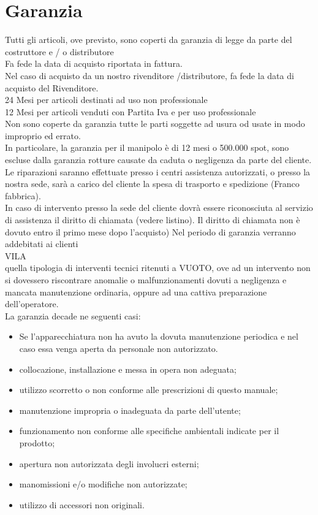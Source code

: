 \documentclass[10pt]{article}
\begin{document}
\section{Garanzia}
Tutti gli articoli, ove previsto, sono coperti da garanzia di legge da parte del costruttore e / o distributore\\
Fa fede la data di acquisto riportata in fattura.\\
Nel caso di acquisto da un nostro rivenditore /distributore, fa fede la data di acquisto del Rivenditore.\\
24 Mesi per articoli destinati ad uso non professionale\\
12 Mesi per articoli venduti con Partita Iva e per uso professionale\\
Non sono coperte da garanzia tutte le parti soggette ad usura od usate in modo improprio ed errato.\\
In particolare, la garanzia per il manipolo è di 12 mesi o 500.000 spot, sono escluse dalla garanzia rotture causate da caduta o negligenza da parte del cliente.\\
Le riparazioni saranno effettuate presso i centri assistenza autorizzati, o presso la nostra sede, sarà a carico del cliente la spesa di trasporto e spedizione (Franco fabbrica).\\
In caso di intervento presso la sede del cliente dovrà essere riconosciuta al servizio di assistenza il diritto di chiamata (vedere listino). Il diritto di chiamata non è dovuto entro il primo mese dopo l'acquisto) Nel periodo di garanzia verranno addebitati ai clienti\\
VILA\\
quella tipologia di interventi tecnici ritenuti a VUOTO, ove ad un intervento non si dovessero riscontrare anomalie o malfunzionamenti dovuti a negligenza e mancata manutenzione ordinaria, oppure ad una cattiva preparazione dell'operatore.\\
La garanzia decade ne seguenti casi:

\begin{itemize}
  \item Se l'apparecchiatura non ha avuto la dovuta manutenzione periodica e nel caso essa venga aperta da personale non autorizzato.
  \item collocazione, installazione e messa in opera non adeguata;
  \item utilizzo scorretto o non conforme alle prescrizioni di questo manuale;
  \item manutenzione impropria o inadeguata da parte dell'utente;
  \item funzionamento non conforme alle specifiche ambientali indicate per il prodotto;
  \item apertura non autorizzata degli involucri esterni;
  \item manomissioni e/o modifiche non autorizzate;
  \item utilizzo di accessori non originali.
\end{itemize}
\end{document}
